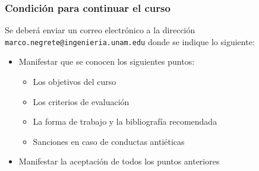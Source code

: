 \begin{frame}\frametitle{Condición para continuar el curso}
  Se deberá enviar un correo electrónico a la dirección \texttt{marco.negrete@ingenieria.unam.edu} donde se indique lo siguiente:
  \begin{itemize}
  \item Manifestar que se conocen los siguientes puntos:
    \begin{itemize}
    \item Los objetivos del curso
    \item Los criterios de evaluación
    \item La forma de trabajo y la bibliografía recomendada
    \item Sanciones en caso de conductas antiéticas
    \end{itemize}
  \item Manifestar la aceptación de todos los puntos anteriores
  \end{itemize}
\end{frame}

